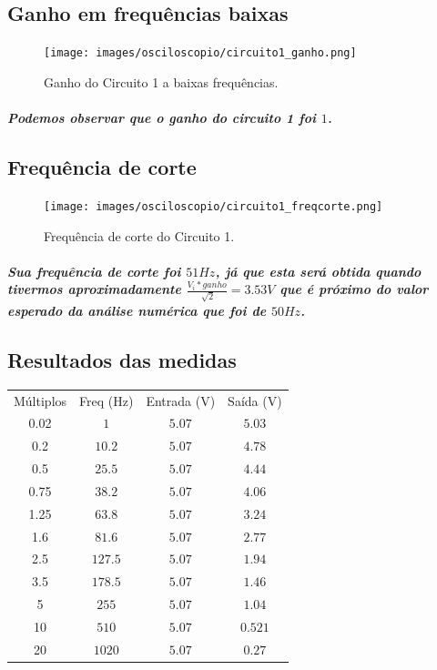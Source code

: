 \documentclass[12pt,twoside, a4paper, twocolumn]{article}
\begin{document}
\subsection{Ganho em frequências baixas}


\begin{figure}[h]
    \centering
    \texttt{[image: images/osciloscopio/circuito1\_ganho.png]}
    \caption{Ganho do Circuito 1 a baixas frequências.}
\end{figure}


\subparagraph{Podemos observar que o ganho do circuito 1 foi $1$.}


\pagebreak


\subsection{Frequência de corte}


\begin{figure}[h]
    \centering
    \texttt{[image: images/osciloscopio/circuito1\_freqcorte.png]}
    \caption{Frequência de corte do Circuito 1.}
\end{figure}


\subparagraph{Sua frequência de corte foi $51Hz$, já que esta será obtida quando tivermos aproximadamente $\frac{V_i * ganho}{\sqrt[]{2}} = 3.53V$ que é próximo do valor esperado da análise numérica que foi de $50Hz$.}


\subsection{Resultados das medidas}
\begin{center}
    \begin{tabular}{ |c|c|c|c| }
        \hline
        Múltiplos & Freq (Hz) & Entrada (V) & Saída (V) \\
        0.02      & $1$       & $5.07$      & $5.03$    \\
        0.2       & $10.2$    & $5.07$      & $4.78$    \\
        0.5       & $25.5$    & $5.07$      & $4.44$    \\
        0.75      & $38.2$    & $5.07$      & $4.06$    \\
        1.25      & $63.8$    & $5.07$      & $3.24$    \\
        1.6       & $81.6$    & $5.07$      & $2.77$    \\
        2.5       & $127.5$   & $5.07$      & $1.94$    \\
        3.5       & $178.5$   & $5.07$      & $1.46$    \\
        5         & $255$     & $5.07$      & $1.04$    \\
        10        & $510$     & $5.07$      & $0.521$   \\
        20        & $1020$    & $5.07$      & $0.27$    \\
        \hline
    \end{tabular}
\end{center}
\end{document}
